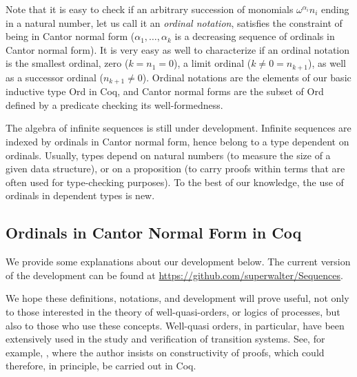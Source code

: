 \documentclass{llncs}
\begin{document}
Note that it is easy to check if an arbitrary succession of monomials
$\omega^{\alpha_i}n_i$
ending in a natural number, let us call it an \emph{ordinal notation},
satisfies the constraint of being in Cantor normal form ($\alpha_1,
\ldots, \alpha_k$ is a decreasing sequence of ordinals in Cantor
normal form).  It is very easy as well to characterize if an ordinal
notation is the smallest ordinal, zero ($k=n_{1}=0$), a limit ordinal
($k\neq 0=n_{k+1}$), as well as a successor ordinal ($n_{k+1}\neq
0$). Ordinal notations are the elements of our basic inductive
type Ord in Coq, and Cantor normal forms are the subset of Ord defined by
a predicate checking its well-formedness.

The algebra of infinite sequences is still under development. Infinite
sequences are indexed by ordinals in Cantor normal form, hence belong
to a type dependent on ordinals. Usually, types depend on natural
numbers (to measure the size of a given data structure), or on a
proposition (to carry proofs within terms that are often used for
type-checking purposes). To the best of our knowledge, the use of ordinals in
dependent types is new.

\subsection{Ordinals in Cantor Normal Form in Coq}

We provide some explanations about our development below.
The current version of the development can be found at
\url{https://github.com/superwalter/Sequences}.

We hope these definitions, notations, and development will prove
useful, not only to those interested in the theory of
well-quasi-orders, or logics of processes, but also to those who use
these concepts. Well-quasi orders, in particular, have been
extensively used in the study and verification of transition systems.
See, for example, \cite{JGL}, where the author insists on constructivity
of  proofs, which could therefore, in principle, be carried out in Coq.
\end{document}
